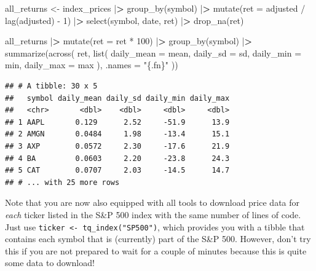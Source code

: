 \documentclass[
]{book}
\newenvironment{Shaded}{\begin{snugshade}}{\end{snugshade}}
\newcommand{\AttributeTok}[1]{\textcolor[rgb]{0.61,0.61,0.61}{#1}}
\newcommand{\DecValTok}[1]{\textcolor[rgb]{0.06,0.06,0.06}{#1}}
\newcommand{\ErrorTok}[1]{\textcolor[rgb]{0.14,0.14,0.14}{\textbf{#1}}}
\newcommand{\FunctionTok}[1]{\textcolor[rgb]{0,0,0}{#1}}
\newcommand{\NormalTok}[1]{#1}
\newcommand{\OtherTok}[1]{\textcolor[rgb]{0.37,0.37,0.37}{#1}}
\newcommand{\SpecialCharTok}[1]{\textcolor[rgb]{0,0,0}{#1}}
\newcommand{\StringTok}[1]{\textcolor[rgb]{0.5,0.5,0.5}{#1}}
\begin{document}
\begin{Shaded}
\begin{Highlighting}[]
\NormalTok{all\_returns }\OtherTok{\textless{}{-}}\NormalTok{ index\_prices }\SpecialCharTok{|}\ErrorTok{\textgreater{}}
  \FunctionTok{group\_by}\NormalTok{(symbol) }\SpecialCharTok{|}\ErrorTok{\textgreater{}}
  \FunctionTok{mutate}\NormalTok{(}\AttributeTok{ret =}\NormalTok{ adjusted }\SpecialCharTok{/} \FunctionTok{lag}\NormalTok{(adjusted) }\SpecialCharTok{{-}} \DecValTok{1}\NormalTok{) }\SpecialCharTok{|}\ErrorTok{\textgreater{}}
  \FunctionTok{select}\NormalTok{(symbol, date, ret) }\SpecialCharTok{|}\ErrorTok{\textgreater{}}
  \FunctionTok{drop\_na}\NormalTok{(ret)}

\NormalTok{all\_returns }\SpecialCharTok{|}\ErrorTok{\textgreater{}}
  \FunctionTok{mutate}\NormalTok{(}\AttributeTok{ret =}\NormalTok{ ret }\SpecialCharTok{*} \DecValTok{100}\NormalTok{) }\SpecialCharTok{|}\ErrorTok{\textgreater{}}
  \FunctionTok{group\_by}\NormalTok{(symbol) }\SpecialCharTok{|}\ErrorTok{\textgreater{}}
  \FunctionTok{summarize}\NormalTok{(}\FunctionTok{across}\NormalTok{(}
\NormalTok{    ret,}
    \FunctionTok{list}\NormalTok{(}
      \AttributeTok{daily\_mean =}\NormalTok{ mean,}
      \AttributeTok{daily\_sd =}\NormalTok{ sd,}
      \AttributeTok{daily\_min =}\NormalTok{ min,}
      \AttributeTok{daily\_max =}\NormalTok{ max}
\NormalTok{    ),}
    \AttributeTok{.names =} \StringTok{"\{.fn\}"}
\NormalTok{  ))}
\end{Highlighting}
\end{Shaded}

\begin{verbatim}
## # A tibble: 30 x 5
##   symbol daily_mean daily_sd daily_min daily_max
##   <chr>       <dbl>    <dbl>     <dbl>     <dbl>
## 1 AAPL       0.129      2.52     -51.9      13.9
## 2 AMGN       0.0484     1.98     -13.4      15.1
## 3 AXP        0.0572     2.30     -17.6      21.9
## 4 BA         0.0603     2.20     -23.8      24.3
## 5 CAT        0.0707     2.03     -14.5      14.7
## # ... with 25 more rows
\end{verbatim}

Note that you are now also equipped with all tools to download price data for \emph{each} ticker listed in the S\&P 500 index with the same number of lines of code. Just use \texttt{ticker\ \textless{}-\ tq\_index("SP500")}, which provides you with a tibble that contains each symbol that is (currently) part of the S\&P 500. However, don't try this if you are not prepared to wait for a couple of minutes because this is quite some data to download!
\end{document}
